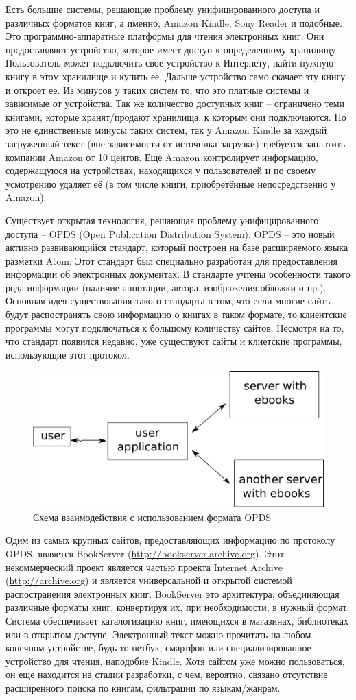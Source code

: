 \documentclass[a4paper]{report}
\begin{document}
Есть большие системы, решающие проблему унифицированного доступа и различных форматов книг, а именно, Amazon Kindle, Sony Reader и подобные. 
Это программно-аппаратные платформы для чтения электронных книг. Они предоставляют устройство, которое имеет доступ к определенному хранилищу. Пользователь может подключить свое устройство к Интернету, найти нужную книгу в этом хранилище и купить ее. Дальше устройство само скачает эту книгу и откроет ее.
Из минусов у таких систем то, что это платные системы и зависимые от устройства. Так же количество доступных книг -- ограничено теми книгами, которые хранят/продают хранилища, к которым они подключаются. Но это не единственные минусы таких систем, так у Amazon Kindle за каждый загруженный текст (вне зависимости от источника загрузки) требуется заплатить компании Amazon от 10 центов. Еще Amazon контролирует информацию, содержащуюся на устройствах, находящихся у пользователей и по своему усмотрению удаляет её (в том числе книги, приобретённые непосредственно у Amazon).

Существует открытая технология, решающая проблему унифицированного доступа  -- OPDS (Open Publication Distribution System).
OPDS -- это новый активно развивающийся стандарт, который построен на базе расширяемого языка разметки Atom. Этот стандарт был специально разработан для предоставления информации об электронных документах. В стандарте учтены особенности такого рода информации (наличие аннотации, автора, изображения обложки и пр.).
Основная идея существования такого стандарта в том, что если многие сайты будут распостранять свою информацию о книгах в таком формате, то клиентские программы могут подключаться к большому количеству сайтов. Несмотря на то, что стандарт появился недавно, уже существуют сайты и клиетские программы, использующие этот протокол. 

\begin{figure}
\centering
\includegraphics[width=.5\textwidth]{scheme}
\caption{Схема взаимодействия с использованием формата OPDS}\label{fig:scheme}
\end{figure}

Одим из самых крупных сайтов, предоставляющих информацию по протоколу OPDS, является BookServer (\url{http://bookserver.archive.org}).
Этот некоммерческий проект является частью проекта Internet Archive (\url{http://archive.org}) и является универсальной и открытой системой распостранения электронных книг. BookServer это архитектура, объединяющая различные форматы книг, конвертируя их, при необходимости, в нужный формат. Система обеспечивает каталогизацию книг, имеющихся в магазинах, библиотеках или в открытом доступе. Электронный текст можно прочитать на любом конечном устройстве, будь то нетбук, смартфон или специализированное устройство для чтения, наподобие Kindle. Хотя сайтом уже можно пользоваться, он еще находится на стадии разработки, с чем, вероятно, связано отсутствие расширенного поиска по книгам, фильтрации по языкам/жанрам. 
\end{document}
